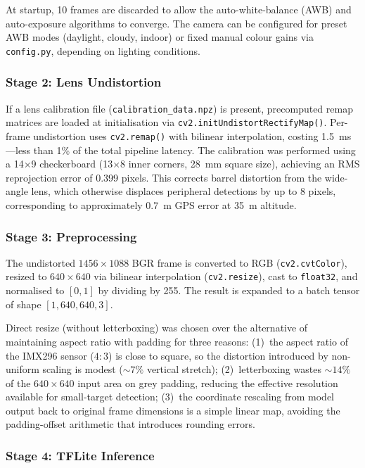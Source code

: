 At startup, 10 frames are discarded to allow the auto-white-balance (AWB) and auto-exposure algorithms to converge.  The camera can be configured for preset AWB modes (daylight, cloudy, indoor) or fixed manual colour gains via \texttt{config.py}, depending on lighting conditions.

\subsubsection{Stage 2: Lens Undistortion}

If a lens calibration file (\texttt{calibration\_data.npz}) is present, precomputed remap matrices are loaded at initialisation via \texttt{cv2.initUndistortRectifyMap()}.  Per-frame undistortion uses \texttt{cv2.remap()} with bilinear interpolation, costing \SI{1.5}{\milli\second}---less than 1\% of the total pipeline latency.  The calibration was performed using a 14$\times$9 checkerboard (13$\times$8 inner corners, \SI{28}{\milli\metre} square size), achieving an RMS reprojection error of 0.399 pixels.  This corrects barrel distortion from the wide-angle lens, which otherwise displaces peripheral detections by up to 8 pixels, corresponding to approximately \SI{0.7}{\metre} GPS error at \SI{35}{\metre} altitude.

\subsubsection{Stage 3: Preprocessing}

The undistorted $1456 \times 1088$ BGR frame is converted to RGB (\texttt{cv2.cvtColor}), resized to $640 \times 640$ via bilinear interpolation (\texttt{cv2.resize}), cast to \texttt{float32}, and normalised to $[0, 1]$ by dividing by 255.  The result is expanded to a batch tensor of shape $[1, 640, 640, 3]$.

Direct resize (without letterboxing) was chosen over the alternative of maintaining aspect ratio with padding for three reasons: (1)~the aspect ratio of the IMX296 sensor ($4{:}3$) is close to square, so the distortion introduced by non-uniform scaling is modest (${\sim}7\%$ vertical stretch); (2)~letterboxing wastes ${\sim}14\%$ of the $640 \times 640$ input area on grey padding, reducing the effective resolution available for small-target detection; (3)~the coordinate rescaling from model output back to original frame dimensions is a simple linear map, avoiding the padding-offset arithmetic that introduces rounding errors.

\subsubsection{Stage 4: TFLite Inference}

